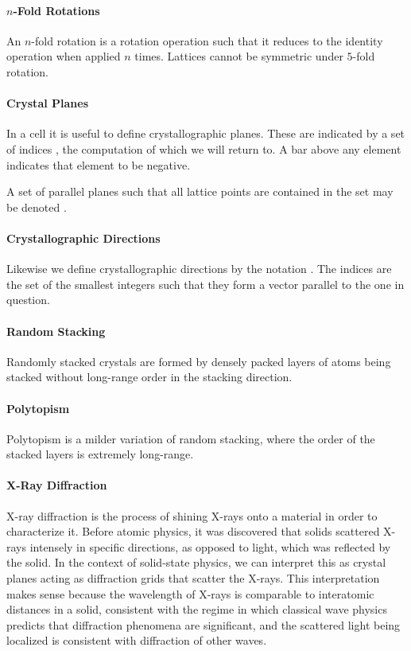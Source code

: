 \paragraph{$n$-Fold Rotations}
An $n$-fold rotation is a rotation operation such that it reduces to the identity operation when applied $n$ times. Lattices cannot be symmetric under $5$-fold rotation.

\paragraph{Crystal Planes}
In a cell it is useful to define crystallographic planes. These are indicated by a set of indices , the computation of which we will return to. A bar above any element indicates that element to be negative.

A set of parallel planes such that all lattice points are contained in the set may be denoted .

\paragraph{Crystallographic Directions}
Likewise we define crystallographic directions by the notation . The indices are the set of the smallest integers such that they form a vector parallel to the one in question.

\paragraph{Random Stacking}
Randomly stacked crystals are formed by densely packed layers of atoms being stacked without long-range order in the stacking direction.

\paragraph{Polytopism}
Polytopism is a milder variation of random stacking, where the order of the stacked layers is extremely long-range.


\paragraph{X-Ray Diffraction}
X-ray diffraction is the process of shining X-rays onto a material in order to characterize it. Before atomic physics, it was discovered that solids scattered X-rays intensely in specific directions, as opposed to light, which was reflected by the solid. In the context of solid-state physics, we can interpret this as crystal planes acting as diffraction grids that scatter the X-rays. This interpretation makes sense because the wavelength of X-rays is comparable to interatomic distances in a solid, consistent with the regime in which classical wave physics predicts that diffraction phenomena are significant, and the scattered light being localized is consistent with diffraction of other waves.

